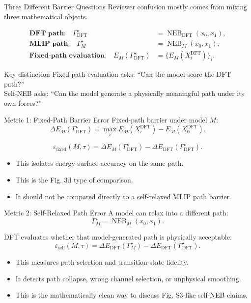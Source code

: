\documentclass[aspectratio=169,10pt]{beamer}
\newcommand{\EM}{E_M}
\newcommand{\Gdft}{\Gamma_{\mathrm{DFT}}^\star}
\newcommand{\GM}{\Gamma_M^\star}
\newcommand{\epsfixed}{\varepsilon_{\mathrm{fixed}}}
\newcommand{\epsself}{\varepsilon_{\mathrm{self}}}
\begin{document}
\begin{frame}{Three Different Barrier Questions}
  Reviewer confusion mostly comes from mixing three mathematical objects.

  \vspace{0.2cm}
  \begin{align*}
  \textbf{DFT path:}\quad
  \Gdft &= \operatorname{NEB}_{\mathrm{DFT}}(x_0,x_1),\\
  \textbf{MLIP path:}\quad
  \GM &= \operatorname{NEB}_{M}(x_0,x_1),\\
  \textbf{Fixed-path evaluation:}\quad
  \EM(\Gdft) &= \{\EM(X_i^{\mathrm{DFT}})\}_i.
  \end{align*}

  \vspace{0.15cm}
  \begin{block}{Key distinction}
  Fixed-path evaluation asks: ``Can the model score the DFT path?''\\
  Self-NEB asks: ``Can the model generate a physically meaningful path under its own forces?''
  \end{block}
\end{frame}

\begin{frame}{Metric 1: Fixed-Path Barrier Error}
  Fixed-path barrier under model $M$:
  \[
  \Delta E_M(\Gdft)
  =
  \max_i \EM(X_i^{\mathrm{DFT}})-\EM(X_0^{\mathrm{DFT}}).
  \]

  \[
  \epsfixed(M,\tau)
  =
  \Delta E_M(\Gdft)
  -
  \Delta E_{\mathrm{DFT}}(\Gdft).
  \]

  \vspace{0.25cm}
  \begin{itemize}
    \item This isolates energy-surface accuracy on the same path.
    \item This is the Fig. 3d type of comparison.
    \item It should not be compared directly to a self-relaxed MLIP path barrier.
  \end{itemize}
\end{frame}

\begin{frame}{Metric 2: Self-Relaxed Path Error}
  A model can relax into a different path:
  \[
  \GM = \operatorname{NEB}_{M}(x_0,x_1).
  \]

  DFT evaluates whether that model-generated path is physically acceptable:
  \[
  \epsself(M,\tau)
  =
  \Delta E_{\mathrm{DFT}}(\GM)
  -
  \Delta E_{\mathrm{DFT}}(\Gdft).
  \]

  \vspace{0.25cm}
  \begin{itemize}
    \item This measures path-selection and transition-state fidelity.
    \item It detects path collapse, wrong channel selection, or unphysical smoothing.
    \item This is the mathematically clean way to discuss Fig. S3-like self-NEB claims.
  \end{itemize}
\end{frame}
\end{document}
